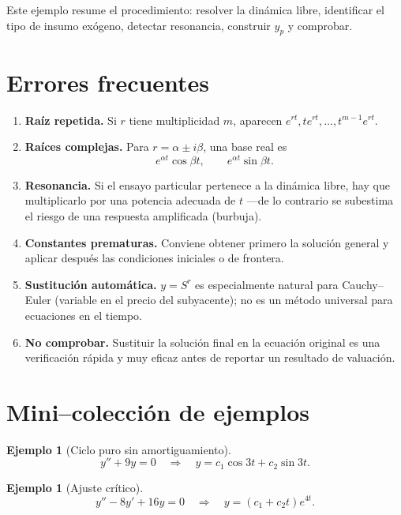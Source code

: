\documentclass[11pt]{article}
\theoremstyle{definition}
\newtheorem{ejemplo}[teorema]{Ejemplo}
\begin{document}
Este ejemplo resume el procedimiento: resolver la dinámica libre, identificar el tipo
de insumo exógeno, detectar resonancia, construir $y_p$ y comprobar.

\section{Errores frecuentes}

\begin{enumerate}
\item \textbf{Raíz repetida.} Si $r$ tiene multiplicidad $m$, aparecen
$e^{rt},te^{rt},\ldots,t^{m-1}e^{rt}$.

\item \textbf{Raíces complejas.} Para $r=\alpha\pm i\beta$, una base real es
\[
e^{\alpha t}\cos\beta t,\qquad e^{\alpha t}\sin\beta t.
\]

\item \textbf{Resonancia.} Si el ensayo particular pertenece a la dinámica libre, hay
que multiplicarlo por una potencia adecuada de $t$ —de lo contrario se subestima el
riesgo de una respuesta amplificada (burbuja).

\item \textbf{Constantes prematuras.} Conviene obtener primero la solución general y
aplicar después las condiciones iniciales o de frontera.

\item \textbf{Sustitución automática.} $y=S^r$ es especialmente natural para
Cauchy--Euler (variable en el precio del subyacente); no es un método universal para
ecuaciones en el tiempo.

\item \textbf{No comprobar.} Sustituir la solución final en la ecuación original es una
verificación rápida y muy eficaz antes de reportar un resultado de valuación.
\end{enumerate}

\section{Mini--colección de ejemplos}

\begin{ejemplo}[Ciclo puro sin amortiguamiento]
\[
y''+9y=0
\quad\Longrightarrow\quad
\boxed{y=c_1\cos3t+c_2\sin3t}.
\]
\end{ejemplo}

\begin{ejemplo}[Ajuste crítico]
\[
y''-8y'+16y=0
\quad\Longrightarrow\quad
\boxed{y=(c_1+c_2t)e^{4t}}.
\]
\end{ejemplo}
\end{document}
